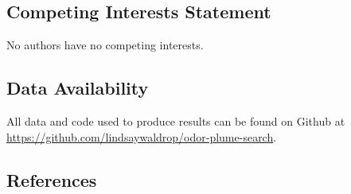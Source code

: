 \documentclass[
]{article}
\begin{document}
\hypertarget{competing-interests-statement}{%
\subsection{Competing Interests Statement}\label{competing-interests-statement}}

No authors have no competing interests.

\hypertarget{data-availability}{%
\subsection{Data Availability}\label{data-availability}}

All data and code used to produce results can be found on Github at \url{https://github.com/lindsaywaldrop/odor-plume-search}.

\hypertarget{references}{%
\subsection*{References}\label{references}}
\end{document}

